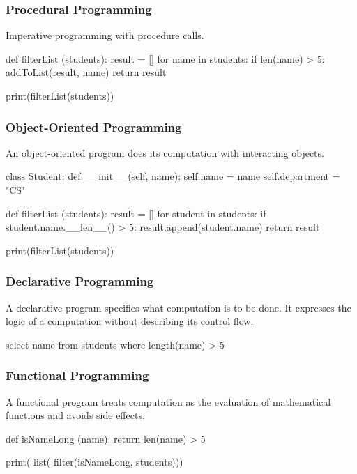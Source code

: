 \documentclass{plt}
\begin{document}
\begin{frame}[fragile]
  \frametitle{Procedural Programming}
Imperative programming with \alert{procedure calls}.

\vspace{10pt}

\begin{python}
def filterList (students):
    result = []
    for name in students:
        if len(name) > 5:
            addToList(result, name)
    return result

print(filterList(students))
\end{python}
\end{frame}


\begin{frame}[fragile]
  \frametitle{Object-Oriented Programming}
An object-oriented program does its computation with interacting \alert{objects}.

\vspace{5pt}

\begin{python}
class Student:
  def __init__(self, name):
    self.name = name
    self.department = "CS"
	
def filterList (students):
    result = []
    for student in students:
        if student.name.__len__() > 5:
            result.append(student.name)
    return result

print(filterList(students))
\end{python}
\end{frame}


\begin{frame}[fragile]
  \frametitle{Declarative Programming}
A declarative program specifies \alert{what} computation is to be done. 
It expresses the logic of a computation without describing its control flow.

\vspace{10pt}

\begin{sql}
select name
from students
where length(name) > 5
\end{sql}
\end{frame}



\begin{frame}[fragile]
  \frametitle{Functional Programming}
A functional program  treats computation as the evaluation of mathematical functions and 
\alert{avoids} side effects.

\vspace{10pt}


\begin{python}
def isNameLong (name):
    return len(name) > 5

print(
  list(
    filter(isNameLong, students)))
\end{python}
\end{frame}
\end{document}
